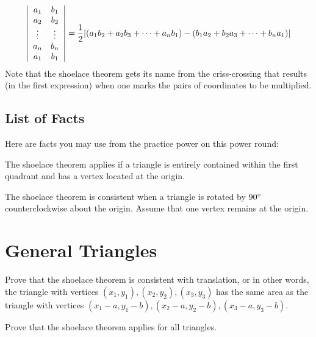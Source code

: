 \documentclass[11pt]{article}
\begin{document}
\begin{definition}
\[\left|\begin{array}{c c}a_1  & b_1 \\ a_2 &  b_2 \\ \vdots & \vdots \\ a_n & b_n \\ a_1 & b_1 \\ \end{array}\right| = \dfrac{1}{2} |(a_1b_2 + a_2b_3 + \cdots + a_nb_1) - (b_1a_2 + b_2a_3 + \cdots + b_na_1)|\]
Note that the shoelace theorem gets its name from the criss-crossing that results (in the first expression) when one marks the pairs of coordinates to be multiplied.
\end{definition}

\subsection{List of Facts}
Here are facts you may use from the practice power on this power round:

\begin{theorem}
The shoelace theorem applies if a triangle is entirely contained within the first quadrant and has a vertex located at the origin.
\end{theorem}

\begin{theorem}
The shoelace theorem is consistent when a triangle is rotated by $90\degree$ counterclockwise about the origin. Assume that one vertex remains at the origin.
\end{theorem}

\section{General Triangles}

\begin{problem}  Prove that the shoelace theorem is consistent with translation, or in other words, the triangle with vertices $(x_1, y_1), (x_2, y_2), (x_3, y_3)$ has the same area as the triangle with vertices $(x_1 - a, y_1 - b), (x_2 - a, y_2 - b ), (x_3 - a, y_3 - b)$. \end{problem}

\begin{solution}

\end{solution}

\begin{problem}  Prove that the shoelace theorem applies for all triangles. \end{problem}
\end{document}
